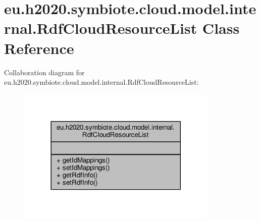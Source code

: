 \hypertarget{classeu_1_1h2020_1_1symbiote_1_1cloud_1_1model_1_1internal_1_1RdfCloudResourceList}{}\section{eu.\+h2020.\+symbiote.\+cloud.\+model.\+internal.\+Rdf\+Cloud\+Resource\+List Class Reference}
\label{classeu_1_1h2020_1_1symbiote_1_1cloud_1_1model_1_1internal_1_1RdfCloudResourceList}


Collaboration diagram for eu.\+h2020.\+symbiote.\+cloud.\+model.\+internal.\+Rdf\+Cloud\+Resource\+List\+:\nopagebreak
\begin{figure}[H]
\begin{center}
\leavevmode
\includegraphics[width=272pt]{classeu_1_1h2020_1_1symbiote_1_1cloud_1_1model_1_1internal_1_1RdfCloudResourceList__coll__graph}
\end{center}
\end{figure}
